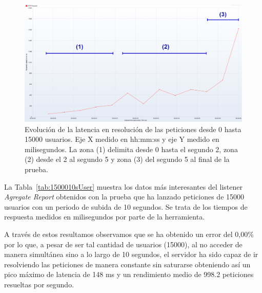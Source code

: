 \begin{figure}[h]
\centering
\includegraphics[scale=0.28]{images/latencia15k.png}
\caption[Evolución de la latencia con 15000 usuarios]{Evolución de la latencia en resolución de las peticiones desde 0 hasta 15000 usuarios. Eje X medido en {\ttfamily hh:mm:ss} y eje Y medido en milisegundos. La zona (1) delimita desde 0 hasta el segundo 2, zona (2) desde el 2 al segundo 5 y zona (3) del segundo 5 al final de la prueba.}%
\label{fig:latencia15k}
\end{figure}


La Tabla~\ref{tab:1500010sUser} muestra los datos más interesantes del listener \textit{Agregate Report} obtenidos con la prueba que ha lanzado peticiones de 15000 usuarios con un periodo de subida de 10 segundos. Se trata de los tiempos de respuesta medidos en milisegundos por parte de la herramienta.

A través de estos resultamos observamos que se ha obtenido un error del 0,00\% por lo que, a pesar de ser tal cantidad de usuarios (15000), al no acceder de manera simultánea sino a lo largo de 10 segundos, el servidor ha sido capaz de ir resolviendo las peticiones de manera constante sin saturarse obteniendo así un pico máximo de latencia de 148 ms y un rendimiento medio de 998.2 peticiones resueltas por segundo.

